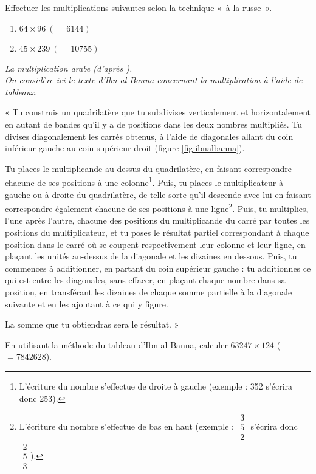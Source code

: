 \noindent Effectuer les multiplications suivantes selon la technique «~à la russe~».
\begin{enumerate}
\item $64 \times 96\ (= 6144)$
\item $45 \times 239\ (= 10755)$
\end{enumerate}

\begin{td}\label{td:ibnalbanna}\em La multiplication arabe (d'après \cite{chabert}).
\\
On consid\`ere ici le texte d'Ibn al-Banna concernant la multiplication
\`a l'aide de tableaux.

{\footnotesize
« Tu construis un quadrilat\`ere que tu subdivises verticalement et
horizontalement en autant de bandes qu'il y a de positions dans les
deux nombres multipli\'es. Tu divises diagonalement les carr\'es
obtenus, \`a l'aide de diagonales allant du coin inf\'erieur gauche au
coin sup\'erieur droit (figure \ref{fig:ibnalbanna}).

Tu places le multiplicande au-dessus du quadrilat\`ere, en faisant 
correspondre chacune de ses positions \`a une colonne\footnote{L'écriture
du nombre s'effectue de droite à gauche (exemple : 352 s'écrira donc 253).}. 
Puis, tu places le multiplicateur \`a gauche ou \`a droite du quadrilat\`ere,
de telle sorte qu'il descende avec lui en faisant correspondre \'egalement 
chacune de ses positions \`a une ligne\footnote{L'écriture
du nombre s'effectue de bas en haut (exemple : {\tiny$\begin{array}{c}3\\5\\2\end{array}$} 
s'écrira donc {\tiny$\begin{array}{c}2\\5\\3\end{array}$}).}. Puis, tu multiplies, 
l'une apr\`es l'autre, chacune des positions du multiplicande du carr\'e 
par toutes les positions du multiplicateur, et tu poses le r\'esultat 
partiel correspondant \`a chaque position dans le carr\'e o\`u se coupent 
respectivement leur colonne et leur ligne, en pla\c{c}ant les unit\'es 
au-dessus de la diagonale et les dizaines en dessous. Puis, tu
commences \`a additionner, en partant du coin sup\'erieur gauche :
tu additionnes ce qui est entre les diagonales, sans effacer, 
en pla\c{c}ant chaque nombre dans sa position, en transf\'erant 
les dizaines de chaque somme partielle \`a la diagonale suivante et
en les ajoutant \`a ce qui y figure. 

La somme que tu obtiendras sera le r\'esultat. »}

\noindent En utilisant la m\'ethode du tableau d'Ibn al-Banna, calculer $63247\times124$ 
($= 7842628$).
\end{td}

